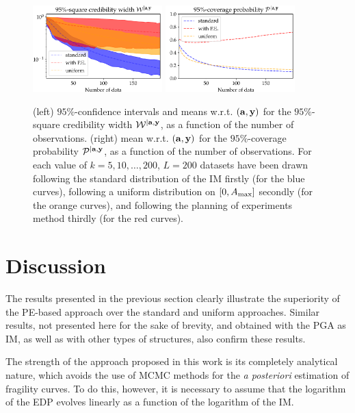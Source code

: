 \begin{figure}[h]
    \centering%
    \includegraphics[width=5cm]{figures/low-doe/errW.pdf}%
    \includegraphics[width=5cm]{figures/low-doe/errP.pdf}%
    \caption{(left) $95\%$-confidence intervals and means w.r.t.{ }$(\mathbf{a},\mathbf{y})$ for the $95\%$-square credibility width $\mathcal{W}^{|\mathbf{a},\mathbf{y}}$, as a function of the number of observations. (right) mean w.r.t.{ }$(\mathbf{a},\mathbf{y})$ for the $95\%$-coverage probability $\mathcal{P}^{|\mathbf{a},\mathbf{y}}$, as a function of the number of observations. For each value of $k=5,10,\dots,200$, $L=200$ datasets have been drawn following the standard distribution of the IM firstly (for the blue curves), {following a uniform distribution on $[0,A_{\rm max}]$ secondly (for the orange curves)}, and following the planning of experiments method thirdly (for the red curves).} %
    \label{lowdoe:fig:credibility}
\end{figure}

\section{Discussion}\label{lowdoe:sec:discussion}

The results presented in the previous section clearly illustrate the superiority of the PE-based approach over the standard {and uniform} approaches. Similar results, not presented here for the sake of brevity, and obtained with the PGA as IM, as well as with other types of structures, also confirm these results.

The strength of the approach proposed in this work is its completely analytical nature, which avoids the use of MCMC methods for the \emph{a posteriori} estimation of fragility curves. To do this, however, it is necessary to assume that the logarithm of the EDP evolves linearly as a function of the logarithm of the IM.

